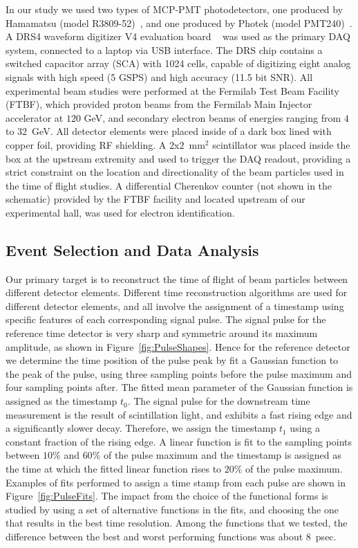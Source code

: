In our study we used two types of MCP-PMT photodetectors, one produced by Hamamatsu 
(model R3809-52)~\cite{HamamatsuMCP3809}, and one produced by Photek (model
PMT240)~\cite{Photek240}. A DRS4  waveform digitizer V4 evaluation
board ~\cite{DRS4} was used as the primary DAQ system, connected to a laptop via
USB interface.  The DRS chip contains a switched capacitor array (SCA) with 1024 cells, 
capable of digitizing eight analog signals with high speed (5 GSPS) and high 
accuracy (11.5 bit SNR). All experimental beam studies were performed at the Fermilab Test
Beam Facility (FTBF), which provided proton beams from the Fermilab Main
Injector accelerator at $120$ GeV, and secondary electron beams of energies
ranging from $4$ to $32$~GeV. All detector elements were placed inside of a dark box
lined with copper foil, providing RF shielding. A $2$x$2$~$\mathrm{mm}^{2}$
scintillator was placed inside the box at the upstream extremity and used to
trigger the DAQ readout, providing a strict constraint on the
location and directionality of the beam particles used in the time of flight
studies. A differential Cherenkov counter (not shown in the schematic)  provided by the FTBF
facility and located upstream of our experimental hall,  was used for electron
identification. 

\subsection{Event Selection and Data Analysis}

Our primary target is to reconstruct the time of flight of beam particles between
different detector elements. Different time reconstruction algorithms are used
for different detector elements, and all involve the assignment of a timestamp
using specific features of each corresponding signal pulse. The signal pulse for
the reference time detector is very sharp and symmetric around its maximum
amplitude, as shown in Figure~\ref{fig:PulseShapes}. Hence for the reference
detector we determine the time position of the pulse peak by fit a Gaussian
function to the peak of the pulse, using three sampling points before the pulse
maximum and four sampling points after. The fitted mean parameter of the
Gaussian function is assigned as the timestamp $t_{0}$. The signal pulse for the
downstream time measurement is the result of scintillation light, and exhibits a
fast rising edge and a significantly slower decay. Therefore, we assign the
timestamp $t_{1}$ using a constant fraction of the rising edge. A linear
function is fit to the sampling points between $10\%$ and $60\%$ of the pulse
maximum and the timestamp is assigned as the time at which the fitted linear
function rises to $20\%$ of the pulse maximum. Examples of fits performed to
assign a time stamp from each pulse are shown in Figure~\ref{fig:PulseFits}. The
impact from the choice of the functional forms is studied by using a set of
alternative functions in the fits, and choosing the one that results in the best
time resolution. Among the functions that we tested, the difference between the
best and worst performing functions was about 8~psec.

